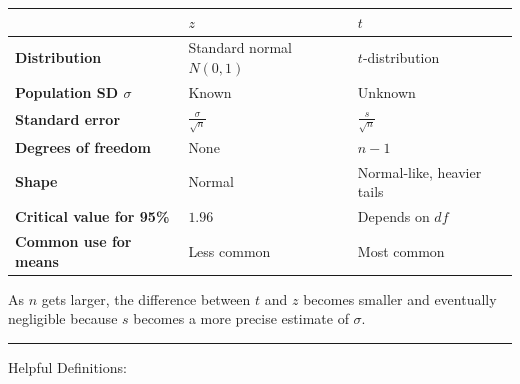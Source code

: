 \documentclass[
  letterpaper,
  DIV=11,
  numbers=noendperiod]{scrreprt}
\newcounter{none} %
\begin{document}
{\def\LTcaptype{none} %
\begin{longtable}[]{@{}
  >{\raggedright\arraybackslash}p{}
  >{\raggedright\arraybackslash}p{}
  >{\raggedright\arraybackslash}p{}@{}}
\toprule\noalign{}
\begin{minipage}[b]{\linewidth}\raggedright
\end{minipage} & \begin{minipage}[b]{\linewidth}\raggedright
\(z\)
\end{minipage} & \begin{minipage}[b]{\linewidth}\raggedright
\(t\)
\end{minipage} \\
\midrule\noalign{}
\endhead
\bottomrule\noalign{}
\endlastfoot
\textbf{Distribution} & Standard normal \(N(0,1)\) &
\(t\)-distribution \\
\textbf{Population SD \(\sigma\)} & Known & Unknown \\
\textbf{Standard error} & \(\frac{\sigma}{\sqrt{n}}\) &
\(\frac{s}{\sqrt{n}}\) \\
\textbf{Degrees of freedom} & None & \(n-1\) \\
\textbf{Shape} & Normal & Normal-like, heavier tails \\
\textbf{Critical value for 95\%} & \(1.96\) & Depends on \(df\) \\
\textbf{Common use for means} & Less common & Most common \\
\end{longtable}
}

As \(n\) gets larger, the difference between \(t\) and \(z\) becomes
smaller and eventually negligible because \(s\) becomes a more precise
estimate of \(\sigma\).

\begin{center}\rule{0.5\linewidth}{0.5pt}\end{center}

Helpful Definitions:
\end{document}
